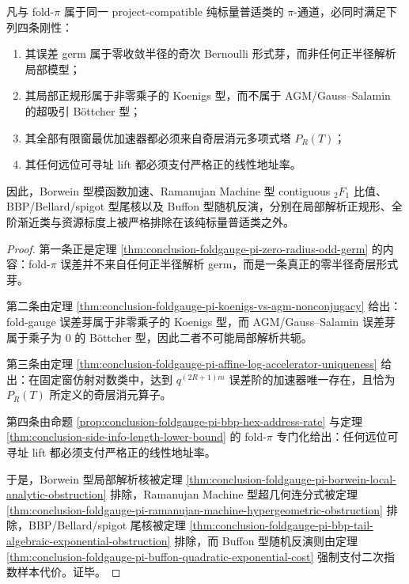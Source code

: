 \begin{theorem}\label{thm:conclusion-foldgauge-pi-purescalar-universality-quadrifurcation}
凡与 fold-\(\pi\) 属于同一 project-compatible 纯标量普适类的 \(\pi\)-通道，必同时满足下列四条刚性：
\begin{enumerate}
  \item 其误差 germ 属于零收敛半径的奇次 Bernoulli 形式芽，而非任何正半径解析局部模型；
  \item 其局部正规形属于非零乘子的 Koenigs 型，而不属于 AGM/Gauss--Salamin 的超吸引 B\"ottcher 型；
  \item 其全部有限窗最优加速器都必须来自奇层消元多项式塔 \(P_R(T)\)；
  \item 其任何远位可寻址 lift 都必须支付严格正的线性地址率。
\end{enumerate}
因此，Borwein 型模函数加速、Ramanujan Machine 型 contiguous \({}_2F_1\) 比值、BBP/Bellard/spigot 型尾核以及 Buffon 型随机反演，分别在局部解析正规形、全阶渐近类与资源标度上被严格排除在该纯标量普适类之外。
\end{theorem}
\begin{proof}
第一条正是定理 \ref{thm:conclusion-foldgauge-pi-zero-radius-odd-germ} 的内容：fold-\(\pi\) 误差并不来自任何正半径解析 germ，而是一条真正的零半径奇层形式芽。

第二条由定理 \ref{thm:conclusion-foldgauge-pi-koenigs-vs-agm-nonconjugacy} 给出：fold-gauge 误差芽属于非零乘子的 Koenigs 型，而 AGM/Gauss--Salamin 误差芽属于乘子为 \(0\) 的 B\"ottcher 型，因此二者不可能局部解析共轭。

第三条由定理 \ref{thm:conclusion-foldgauge-pi-affine-log-accelerator-uniqueness} 给出：在固定窗仿射对数类中，达到 \(q^{(2R+1)m}\) 误差阶的加速器唯一存在，且恰为 \(P_R(T)\) 所定义的奇层消元算子。

第四条由命题 \ref{prop:conclusion-foldgauge-pi-bbp-hex-address-rate} 与定理 \ref{thm:conclusion-side-info-length-lower-bound} 的 fold-\(\pi\) 专门化给出：任何远位可寻址 lift 都必须支付严格正的线性地址率。

于是，Borwein 型局部解析核被定理 \ref{thm:conclusion-foldgauge-pi-borwein-local-analytic-obstruction} 排除，Ramanujan Machine 型超几何连分式被定理 \ref{thm:conclusion-foldgauge-pi-ramanujan-machine-hypergeometric-obstruction} 排除，BBP/Bellard/spigot 尾核被定理 \ref{thm:conclusion-foldgauge-pi-bbp-tail-algebraic-exponential-obstruction} 排除，而 Buffon 型随机反演则由定理 \ref{thm:conclusion-foldgauge-pi-buffon-quadratic-exponential-cost} 强制支付二次指数样本代价。证毕。
\end{proof}

